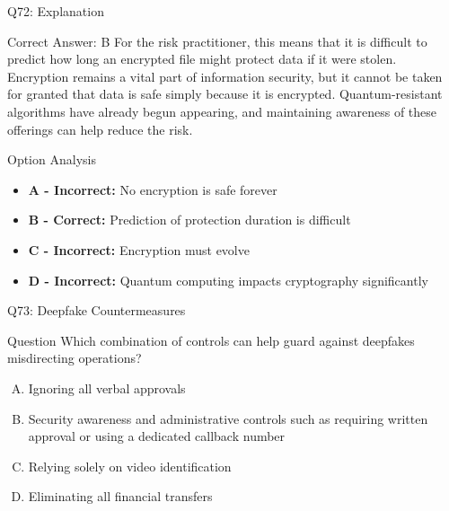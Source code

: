 \documentclass{beamer}
\begin{document}
	\begin{frame}{Q72: Explanation}
		\begin{block}{Correct Answer: B}
			For the risk practitioner, this means that it is difficult to predict how long an encrypted file might protect data if it were stolen. Encryption remains a vital part of information security, but it cannot be taken for granted that data is safe simply because it is encrypted. Quantum-resistant algorithms have already begun appearing, and maintaining awareness of these offerings can help reduce the risk.
		\end{block}
		\begin{block}{Option Analysis}
			\begin{itemize}
				\item \textbf{A - Incorrect:} No encryption is safe forever
				\item \textbf{B - Correct:} Prediction of protection duration is difficult
				\item \textbf{C - Incorrect:} Encryption must evolve
				\item \textbf{D - Incorrect:} Quantum computing impacts cryptography significantly
			\end{itemize}
		\end{block}
	\end{frame}
	
	\begin{frame}{Q73: Deepfake Countermeasures}
		\begin{block}{Question}
			Which combination of controls can help guard against deepfakes misdirecting operations?
		\end{block}
		\begin{enumerate}[(A)]
			\item Ignoring all verbal approvals
			\item Security awareness and administrative controls such as requiring written approval or using a dedicated callback number
			\item Relying solely on video identification
			\item Eliminating all financial transfers
		\end{enumerate}
	\end{frame}
	
\end{document}
